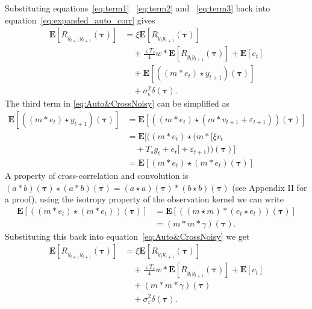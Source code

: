 \documentclass[conference,onecolumn]{IEEEtran}
\begin{document}
Substituting equations~\ref{eq:term1} ~\ref{eq:term2} and ~\ref{eq:term3} back into equation~\ref{eq:expanded_auto_corr} gives
\begin{align}\label{eq:Auto&CrossNoisy}
	\mathbf{E}[R_{y_{t+1}y_{t+1}}(\boldsymbol{\tau})] &= \xi \mathbf{E}[R_{y_ty_{t+1}}(\boldsymbol{\tau})] \nonumber \\
	&\quad+  \frac{\varsigma T_s}{4} w \ast \mathbf{E}[R_{y_ty_{t+1}}(\boldsymbol\tau)]  + \mathbf{E}[c_t] \nonumber \\
	&\quad+\mathbf{E}[((m\ast e_t)\star y_{t+1})(\boldsymbol\tau)] \nonumber \\ 
	&\quad+\sigma_{\epsilon}^2\delta(\boldsymbol{\tau}).
\end{align}
The third term in \eqref{eq:Auto&CrossNoisy} can be simplified as
\begin{align}\label{eq:term3Noisy}
\mathbf{E}[((m\ast e_t)\star y_{t+1})(\boldsymbol\tau)] &= \mathbf{E}[((m\ast e_t)\star (m\ast v_{t+1}+\varepsilon_{t+1})) (\boldsymbol\tau)] \\
	&= \mathbf{E}[(\left(m \ast e_t\right) \star (m \ast [\xi v_t \nonumber \\
	&\quad + T_s g_t + e_t]+\varepsilon_{t+1}))(\boldsymbol\tau)] \\
	&=\mathbf{E}[\left(m \ast e_t\right)\star\left(m \ast e_t\right)(\boldsymbol\tau)]
\end{align}
A property of cross-correlation and convolution is $(a \ast b)(\boldsymbol\tau) \star (a \ast b)(\boldsymbol\tau)=(a \star a)(\boldsymbol\tau)\ast(b \star b)(\boldsymbol\tau)$ (see Appendix II for a proof), using the isotropy property of the observation kernel we can write
\begin{align}\label{eq:term4}
\mathbf{E}[(\left(m \ast e_t\right)\star\left(m \ast e_t\right))(\boldsymbol\tau)]&=\mathbf{E}[(\left(m \star m\right)\ast\left(e_t \star e_t\right))(\boldsymbol\tau)] \\
&=(m\ast m \ast \gamma)(\boldsymbol\tau).
\end{align}
Substituting this back into equation~\ref{eq:Auto&CrossNoisy} we get
\begin{align}
	\mathbf{E}[R_{y_{t+1}y_{t+1}}(\boldsymbol{\tau})] &= \xi \mathbf{E}[R_{y_ty_{t+1}}(\boldsymbol{\tau})] \nonumber \\
	&\quad+  \frac{\varsigma T_s}{4} w \ast \mathbf{E}[R_{y_ty_{t+1}}(\boldsymbol\tau)]  + \mathbf{E}[c_t] \nonumber \\
	&\quad+(m\ast m \ast \gamma)(\boldsymbol\tau) \nonumber \\ 
	&\quad+\sigma_{\varepsilon}^2\delta(\boldsymbol{\tau}).
\end{align}
\end{document}
